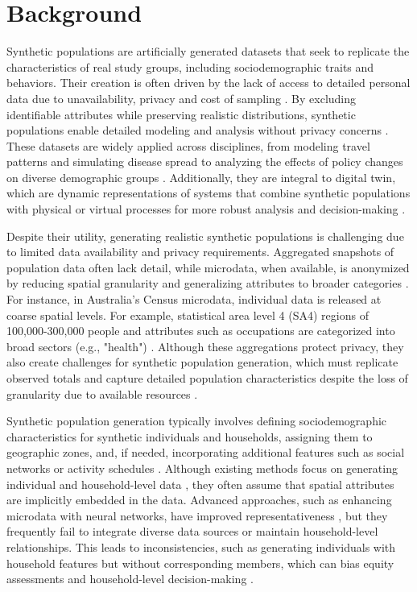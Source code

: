 ﻿\documentclass[../main.tex]{subfiles}
\begin{document}
\section{Background}


Synthetic populations are artificially generated datasets that seek to replicate the characteristics of real study groups, including sociodemographic traits and behaviors. Their creation is often driven by the lack of access to detailed personal data due to unavailability, privacy and cost of sampling \citep{Chapuis2022GenerationPractices}. By excluding identifiable attributes while preserving realistic distributions, synthetic populations enable detailed modeling and analysis without privacy concerns \citep{Wu2018GeneratingDatasets}. These datasets are widely applied across disciplines, from modeling travel patterns and simulating disease spread to analyzing the effects of policy changes on diverse demographic groups \citep{Edwards2009TheSimObesity,Sallard2023TravelSwitzerland}. Additionally, they are integral to digital twin, which are dynamic representations of systems that combine synthetic populations with physical or virtual processes for more robust analysis and decision-making \citep{ElSaddik2018DigitalTechnologies}.

Despite their utility, generating realistic synthetic populations is challenging due to limited data availability and privacy requirements. Aggregated snapshots of population data often lack detail, while microdata, when available, is anonymized by reducing spatial granularity and generalizing attributes to broader categories \citep{Tanton2009OldAustralians}. For instance, in Australia's Census microdata, individual data is released at coarse spatial levels. For example, statistical area level 4 (SA4) regions of 100,000-300,000 people and attributes such as occupations are categorized into broad sectors (e.g., "health") \citep{AustralianBureauofStatistics2021CensusTools}. Although these aggregations protect privacy, they also create challenges for synthetic population generation, which must replicate observed totals and capture detailed population characteristics despite the loss of granularity due to available resources \citep{Sun2015ASynthesis}.

Synthetic population generation typically involves defining sociodemographic characteristics for synthetic individuals and households, assigning them to geographic zones, and, if needed, incorporating additional features such as social networks or activity schedules \citep{Somanath2025Activity-basedEquity}. Although existing methods focus on generating individual and household-level data \citep{Lenormand2013GeneratingMethods, Gargiulo2010AnHouseholds}, they often assume that spatial attributes are implicitly embedded in the data. Advanced approaches, such as enhancing microdata with neural networks, have improved representativeness \citep{Sun2015ASynthesis, Sun2018ASynthesis}, but they frequently fail to integrate diverse data sources or maintain household-level relationships. This leads to inconsistencies, such as generating individuals with household features but without corresponding members, which can bias equity assessments and household-level decision-making \citep{Qian2024ASynthesis}.
\end{document}
